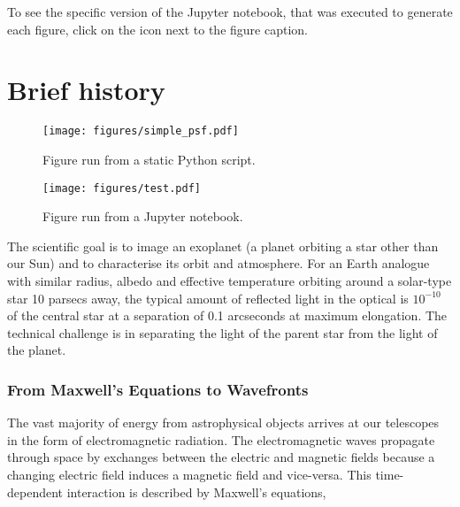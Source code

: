 \documentclass[letterpaper]{ar-1col}
\newcommand{\project}[1]{\textsf{#1}}
\begin{document}
To see the specific version of the \project{Jupyter} notebook, that was executed to generate each figure, click on the icon next to the figure caption.

\section{Brief history}


\begin{figure}[ht]
  \centering
  \texttt{[image: figures/simple\_psf.pdf]}
  \caption{Figure run from a static Python script.}
  \label{fig:simplepsf}
\end{figure}



\begin{figure}[ht]
  \centering
  \texttt{[image: figures/test.pdf]}
  \caption{Figure run from a Jupyter notebook.}
  \label{fig:fresnel}
\end{figure}



The scientific goal is to image an exoplanet (a planet orbiting a star other than our Sun) and to characterise its orbit and atmosphere.
%
For an Earth analogue with similar radius, albedo and effective temperature orbiting around a solar-type star 10 parsecs away, the typical amount of reflected light in the optical is $10^{-10}$ of the central star at a separation of 0.1 arcseconds at maximum elongation.
%
The technical challenge is in separating the  light of the parent star from the light of the planet.

\subsubsection{From Maxwell's Equations to Wavefronts}
The vast majority of energy from astrophysical objects arrives at our telescopes in the form of electromagnetic radiation. The electromagnetic waves propagate through space by exchanges between the electric and magnetic fields because a changing electric field induces a magnetic field and vice-versa. This time-dependent interaction is described by Maxwell's equations,
\end{document}
